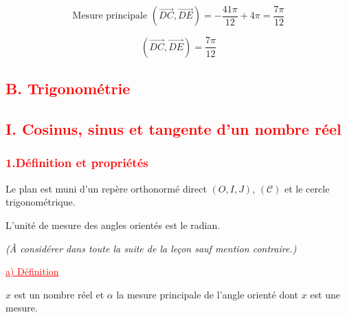 \documentclass[a4paper,12pt]{article}
\begin{document}
\[
    \text{Mesure principale } (\overrightarrow{DC}, \overrightarrow{DE}) = -\dfrac{41\pi}{12} + 4\pi =   \dfrac{7\pi}{12}
\]

\[
    \boxed{(\overrightarrow{DC}, \overrightarrow{DE}) = \dfrac{7\pi}{12}}
\]

\subsection*{\textcolor{red}{B. Trigonométrie}}

\subsection*{\textcolor{red}{I. Cosinus, sinus et tangente d’un nombre réel}}

\subsubsection*{\textcolor{red}{1.Définition et propriétés }}

Le plan est muni d’un repère orthonormé direct \( (O, I, J) \), $\mathcal{(C)}$ et le cercle trigonométrique.

L’unité de mesure des angles orientés est le radian.

\begin{flushleft}
    \textit{(À considérer dans toute la suite de la leçon sauf mention contraire.)}
\end{flushleft}

\vspace{1em}
\textcolor{red}{\underline{a) Définition}}

\vspace{0.5em}

\( x \) est un nombre réel et \( \alpha \) la mesure principale de l’angle orienté dont \( x \) est une mesure.
\end{document}
